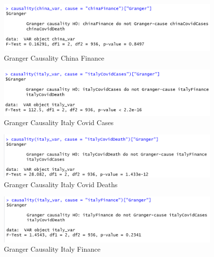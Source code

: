 \documentclass[11pt]{article}
\begin{document}
\begin{figure}[!h]
\centering
  \includegraphics[width=\textwidth]{R-Code/Causalities/China_Finantial.png}  
  \caption{Granger Causality China Finance}
  \end{figure}
  
  
\begin{figure}[!h]
\centering
  \includegraphics[width=\textwidth]{R-Code/Causalities/Italy_CC.png}  
  \caption{Granger Causality Italy Covid Cases}
  \end{figure}
\begin{figure}[!h]
\centering
  \includegraphics[width=\textwidth]{R-Code/Causalities/Italy_CD.png}  
  \caption{Granger Causality Italy Covid Deaths}
  \end{figure}
 
\begin{figure}[!h]
\centering
  \includegraphics[width=\textwidth]{R-Code/Causalities/Italy_F.png}  
  \caption{Granger Causality Italy Finance}
  \end{figure}
\end{document}
